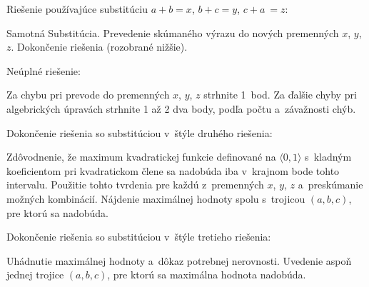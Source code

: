 {\Podnadpis Riešenie používajúce substitúciu $a+b = x$, $b+c = y$, $c+a~= z$:

 Samotná Substitúcia.
 Prevedenie skúmaného výrazu do nových premenných $x$, $y$, $z$.
 Dokončenie riešenia (rozobrané nižšie).

\Podnadpis Neúplné riešenie:

\Item Za chybu pri prevode do premenných $x$, $y$, $z$ strhnite 1~bod.
\Item Za ďalšie chyby pri algebrických úpravách strhnite 1 až 2 dva body, podľa počtu a~závažnosti chýb.

\Podnadpis Dokončenie riešenia so substitúciou v~štýle druhého riešenia:

 Zdôvodnenie, že maximum kvadratickej funkcie
definované na $\langle 0,1 \rangle$ s~kladným koeficientom
pri kvadratickom člene sa nadobúda iba v~krajnom bode tohto intervalu.
 Použitie tohto tvrdenia pre každú z~premenných $x$, $y$, $z$ a~preskúmanie možných kombinácií.
 Nájdenie maximálnej hodnoty spolu s~trojicou $(a, b, c)$, pre ktorú sa nadobúda.

\Podnadpis Dokončenie riešenia so substitúciou v~štýle tretieho riešenia:

 Uhádnutie maximálnej hodnoty a~dôkaz potrebnej nerovnosti.
 Uvedenie aspoň jednej trojice $(a, b, c)$, pre ktorú sa maximálna hodnota nadobúda.

\EndSchema


\endpetit
\bigbreak
}

